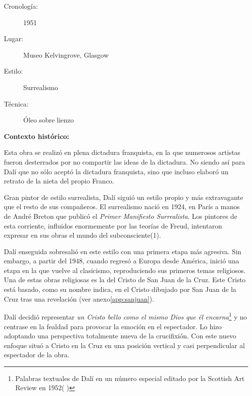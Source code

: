 
\begin{description}
\item[Cronología:] 1951
\item[Lugar:] Museo Kelvingrove, Glasgow
\item[Estilo:] Surrealismo
\item[Técnica:] Óleo sobre lienzo
\end{description}

\textbf{Contexto histórico:}

Esta obra se realizó en plena dictadura franquista, en la que numerosos artistas fueron desterrados por no compartir las ideas de la dictadura. No siendo así para Dalí que no sólo aceptó la dictadura franquista, sino que incluso elaboró un retrato de la nieta del propio Franco.

Gran pintor de estilo surrealista, Dalí siguió un estilo propio y más extravagante que el resto de sus compañeros. El surrealismo nació en 1924, en París a manos de André Breton que publicó el \textit{Primer Manifiesto Surrealista}. Los pintores de esta corriente, influidos enormemente por las teorías de Freud, intentaron expresar en sus obras el mundo del subconsciente(1).

Dalí enseguida sobresalió en este estilo con una primera etapa más agresiva. Sin embargo, a partir del 1948, cuando regresó a Europa desde América, inició una etapa en la que vuelve al clasicismo, reproduciendo sus primeros temas religiosos. Una de estas obras religiosas es la del Cristo de San Juan de la Cruz. Este Cristo está basado, como su nombre indica, en el Cristo dibujado por San Juan de la Cruz tras una revelación (ver anexo\autoref{app:sanjuan}).

Dalí decidió representar \textit{un Cristo bello como el mismo Dios que él encarna}\footnote{Palabras textuales de Dalí en un número especial editado por la Scottish Art Review en 1952(%
)} y no centrase en la fealdad para provocar la emoción en el espectador. Lo hizo adoptando una perspectiva totalmente nueva de la crucifixión. Con este nuevo enfoque situó a Cristo en la Cruz en una posición vertical y casi perpendicular al espectador de la obra.

